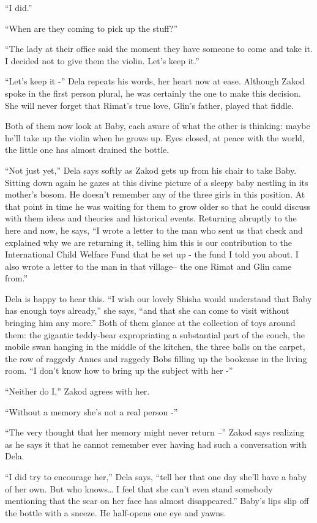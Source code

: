 \documentclass[twoside,11pt]{book}
\begin{document}
``I did.''

``When are they coming to pick up the stuff?''

``The lady at their office said the moment they have someone to come and take it. I decided not to give
them the violin. Let's keep it.''

``Let's keep it -'' Dela repeats his words, her heart now at ease. Although Zakod spoke in the
first person plural, he was certainly the one to make this decision. She will never forget that Rimat's true love,
Glin's father, played that fiddle.

Both of them now look at Baby, each aware of what the other is thinking: maybe he'll take up the violin when he grows
up. Eyes closed, at peace with the world, the little one has almost drained the bottle.

``Not just yet,'' Dela says softly as Zakod gets up from his chair to take Baby. Sitting down
again he gazes at this divine picture of a sleepy baby nestling in its mother's bosom. He doesn't remember any of the
three girls in this position. At that point in time he was waiting for them to grow older so that he could discuss with
them ideas and theories and historical events. Returning abruptly to the here and now, he says, ``I wrote
a letter to the man who sent us that check and explained why we are returning it, telling him this is our contribution
to the International Child Welfare Fund that he set up - the fund I told you about.  I also wrote a letter to the man
in that village-- the one Rimat and Glin came from.''

Dela is happy to hear this. ``I wish our lovely Shisha would understand that Baby has enough toys
already,'' she says, ``and that she can come to visit without bringing him any more.'' Both of them
glance at the collection of toys around them: the gigantic teddy-bear expropriating a substantial part of the couch,
the mobile swan hanging in the middle of the kitchen, the three balls on the carpet, the row of raggedy Annes and
raggedy Bobs filling up the bookcase in the living room. ``I don't know how to bring up the subject with
her -''

``Neither do I,'' Zakod agrees with her.

``Without a memory she's not a real person -''

``The very thought that her memory might never return --'' Zakod says realizing as he says it
that he cannot remember ever having had such a conversation with Dela.

``I did try to encourage her,'' Dela says, ``tell her that one day she'll have a
baby of her own. But who knows{\ldots} I feel that she can't even stand somebody mentioning that the scar on her face has
almost disappeared.'' Baby's lips slip off the bottle with a sneeze. He half-opens one eye and yawns.
\end{document}
